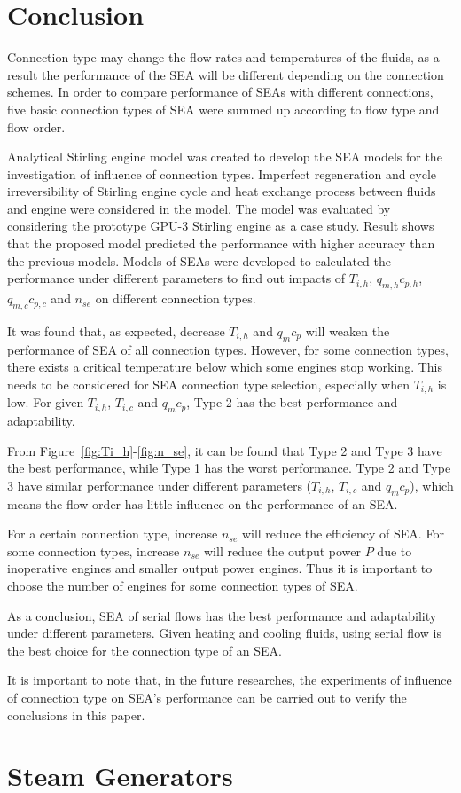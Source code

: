 \section{Conclusion}

Connection type may change the flow rates and temperatures of the fluids, as a result the performance of the SEA will be different depending on the connection schemes. In order to compare performance of SEAs with different connections, five basic connection types of SEA were summed up according to flow type and flow order.

Analytical Stirling engine model was created to develop the SEA models for the investigation of influence of connection types. Imperfect regeneration and cycle irreversibility of Stirling engine cycle and heat exchange process between fluids and engine were considered in the model. The model was evaluated by considering the prototype GPU-3 Stirling engine as a case study. Result shows that the proposed model predicted the performance with higher accuracy than the previous models. Models of SEAs were developed to calculated the performance under different parameters to find out impacts of $T_{i,h}$, $q_{m,h}c_{p,h}$, $q_{m,c}c_{p,c}$ and $n_{se}$ on different connection types.

It was found that, as expected, decrease $T_{i,h}$ and $q_{m}c_{p}$ will weaken the performance of SEA of all connection types. However, for some connection types, there exists a critical temperature below which some engines stop working. This needs to be considered for SEA connection type selection, especially when $T_{i,h}$ is low. For given $T_{i,h}$, $T_{i,c}$ and $q_mc_p$, Type 2 has the best performance and adaptability.

From Figure~\ref{fig:Ti_h}-\ref{fig:n_se}, it can be found that Type 2 and Type 3 have the best performance, while Type 1 has the worst performance. Type 2 and Type 3 have similar performance under different parameters ($T_{i,h}$, $T_{i,c}$ and $q_mc_p$), which means the flow order has little influence on the performance of an SEA.

For a certain connection type, increase $n_{se}$ will reduce the efficiency of SEA. For some connection types, increase $n_{se}$ will reduce the output power $P$ due to inoperative engines and smaller output power engines. Thus it is important to choose the number of engines for some connection types of SEA.

As a conclusion, SEA of serial flows has the best performance and adaptability under different parameters. Given heating and cooling fluids, using serial flow is the best choice for the connection type of an SEA. %

It is important to note that, in the future researches, the experiments of influence of connection type on SEA's performance can be carried out to verify the conclusions in this paper.
\section{Steam Generators}
